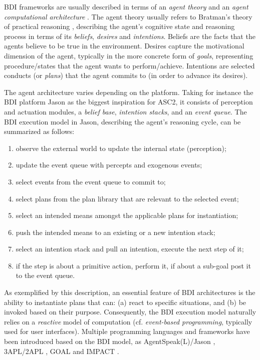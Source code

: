 BDI frameworks are usually described in terms of an \textit{agent theory} and an \textit{agent computational architecture} \cite{Fisher2007}. %
The agent theory usually refers to Bratman's theory of practical reasoning \cite{bratman1987intention}, describing the agent's cognitive state and reasoning process in terms of its \textit{beliefs}, \textit{desires} and \textit{intentions}. Beliefs are the facts that the agents believe to be true in the environment. Desires capture the motivational dimension of the agent, typically in the more concrete form of \textit{goals}, representing procedure/states that the agent wants to perform/achieve. Intentions are selected conducts (or \textit{plans}) that the agent commits to (in order to advance its desires).

The agent architecture varies depending on the platform. Taking for instance the BDI platform Jason \cite{Bordini2005} as the biggest inspiration for ASC2, it consists of perception and actuation modules, a \textit{belief base}, \textit{intention stacks}, and an \textit{event queue}. The BDI execution model in Jason, describing the agent's reasoning cycle, can be summarized as follows:
\begin{enumerate}[noitemsep]
	\item  observe the external world to update the internal state (perception);
	\item  update the event queue with percepts and exogenous events;
	\item  select events from the event queue to commit to;
	\item  select plans from the plan library that are relevant to the selected event;
	\item select an intended means amongst the applicable plans for instantiation; %
	\item push the intended means to an existing or a new intention stack; %
	\item select an intention stack and pull an intention, execute the next step of it; %
	\item if the step is about a primitive action, perform it, if about a sub-goal post it to the event queue.
\end{enumerate}
As exemplified by this description, an essential feature of BDI architectures \cite{Rao1995} is the ability to instantiate plans that can: (a) react to specific situations, and (b) be invoked based on their purpose. Consequently, the BDI execution model naturally relies on a \textit{reactive} model of computation (cf. \textit{event-based programming}, typically used for user interfaces). %
Multiple programming languages and frameworks have been introduced based on the BDI model, as AgentSpeak(L)/Jason \cite{RaoAS1996,Bordini2005}, 3APL/2APL \cite{Dastani2APL}, GOAL \cite{Hindriks2009a} and IMPACT \cite{IMPACT}.

